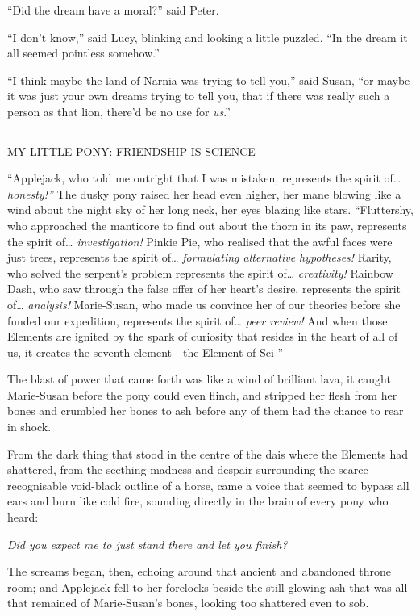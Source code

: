``Did the dream have a moral?'' said Peter.

``I don't know,'' said Lucy, blinking and looking a little puzzled. ``In
the dream it all seemed pointless somehow.''

``I think maybe the land of Narnia was trying to tell you,'' said Susan,
``or maybe it was just your own dreams trying to tell you, that if there
was really such a person as that lion, there'd be no use for
\emph{us}.''

\begin{center}\rule{3in}{0.4pt}\end{center}

MY LITTLE PONY: FRIENDSHIP IS SCIENCE

``Applejack, who told me outright that I was mistaken, represents the
spirit of\ldots{} \emph{honesty!''} The dusky pony raised her head even
higher, her mane blowing like a wind about the night sky of her long
neck, her eyes blazing like stars. ``Fluttershy, who approached the
manticore to find out about the thorn in its paw, represents the spirit
of\ldots{} \emph{investigation!} Pinkie Pie, who realised that the awful
faces were just trees, represents the spirit of\ldots{}
\emph{formulating alternative hypotheses!} Rarity, who solved the
serpent's problem represents the spirit of\ldots{} \emph{creativity!}
Rainbow Dash, who saw through the false offer of her heart's desire,
represents the spirit of\ldots{} \emph{analysis!} Marie-Susan, who made
us convince her of our theories before she funded our expedition,
represents the spirit of\ldots{} \emph{peer review!} And when those
Elements are ignited by the spark of curiosity that resides in the heart
of all of us, it creates the seventh element---the Element of Sci-''

The blast of power that came forth was like a wind of brilliant lava, it
caught Marie-Susan before the pony could even flinch, and stripped her
flesh from her bones and crumbled her bones to ash before any of them
had the chance to rear in shock.

From the dark thing that stood in the centre of the dais where the
Elements had shattered, from the seething madness and despair
surrounding the scarce-recognisable void-black outline of a horse, came
a voice that seemed to bypass all ears and burn like cold fire, sounding
directly in the brain of every pony who heard:

\emph{Did you expect me to just stand there and let you finish?}

The screams began, then, echoing around that ancient and abandoned
throne room; and Applejack fell to her forelocks beside the
still-glowing ash that was all that remained of Marie-Susan's bones,
looking too shattered even to sob.

